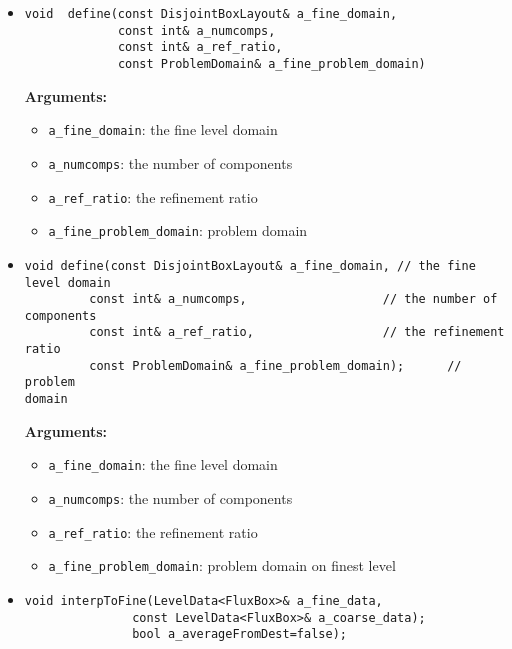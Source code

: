 \begin{itemize}
\item
\begin{verbatim}
void  define(const DisjointBoxLayout& a_fine_domain, 
             const int& a_numcomps,                   
             const int& a_ref_ratio,                  
             const ProblemDomain& a_fine_problem_domain)
\end{verbatim}
{\bf Arguments: }
\begin{itemize}
\item
\verb/a_fine_domain/: the fine level domain
\item
\verb/a_numcomps/: the number of components
\item
\verb/a_ref_ratio/: the refinement ratio
\item
\verb/a_fine_problem_domain/: problem domain
\end{itemize}
             
\item
\begin{verbatim}
void define(const DisjointBoxLayout& a_fine_domain, // the fine level domain
         const int& a_numcomps,                   // the number of components
         const int& a_ref_ratio,                  // the refinement ratio
         const ProblemDomain& a_fine_problem_domain);      // problem
domain
\end{verbatim}
{\bf Arguments:}
\begin{itemize}
\item
\verb/a_fine_domain/: the fine level domain
\item
\verb/a_numcomps/: the number of components
\item
\verb/a_ref_ratio/: the refinement ratio
\item
\verb/a_fine_problem_domain/: problem domain on finest level
\end{itemize}

\item
\begin{verbatim}
void interpToFine(LevelData<FluxBox>& a_fine_data,
               const LevelData<FluxBox>& a_coarse_data);
               bool a_averageFromDest=false);
\end{verbatim}

\end{itemize}
